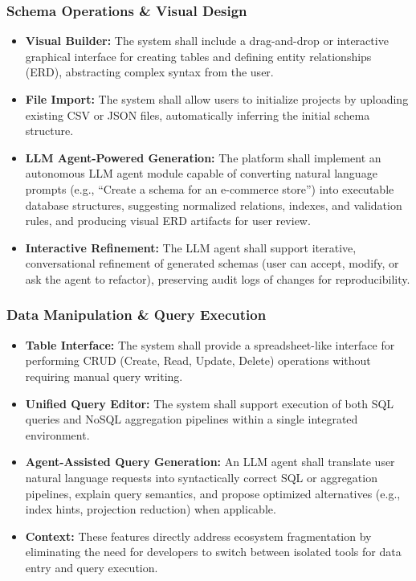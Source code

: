 \subsubsection*{Schema Operations \& Visual Design}
\begin{itemize}
    \item \textbf{Visual Builder:} The system shall include a drag-and-drop or interactive graphical interface for creating tables and defining entity relationships (ERD), abstracting complex syntax from the user.
    \item \textbf{File Import:} The system shall allow users to initialize projects by uploading existing CSV or JSON files, automatically inferring the initial schema structure.
    \item \textbf{LLM Agent-Powered Generation:} The platform shall implement an autonomous LLM agent module capable of converting natural language prompts (e.g., ``Create a schema for an e-commerce store'') into executable database structures, suggesting normalized relations, indexes, and validation rules, and producing visual ERD artifacts for user review.
    \item \textbf{Interactive Refinement:} The LLM agent shall support iterative, conversational refinement of generated schemas (user can accept, modify, or ask the agent to refactor), preserving audit logs of changes for reproducibility.
\end{itemize}

\subsubsection*{Data Manipulation \& Query Execution}
\begin{itemize}
    \item \textbf{Table Interface:} The system shall provide a spreadsheet-like interface for performing CRUD (Create, Read, Update, Delete) operations without requiring manual query writing.
    \item \textbf{Unified Query Editor:} The system shall support execution of both SQL queries and NoSQL aggregation pipelines within a single integrated environment.
    \item \textbf{Agent-Assisted Query Generation:} An LLM agent shall translate user natural language requests into syntactically correct SQL or aggregation pipelines, explain query semantics, and propose optimized alternatives (e.g., index hints, projection reduction) when applicable.
    \item \textbf{Context:} These features directly address ecosystem fragmentation by eliminating the need for developers to switch between isolated tools for data entry and query execution.
\end{itemize}

